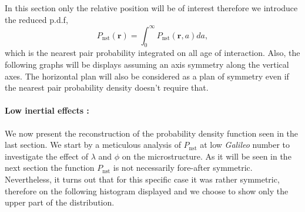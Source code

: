 In this section only the relative position will be of interest therefore we introduce the reduced p.d.f,
\begin{equation*}
    P_\text{nst}(\textbf{r})
    =\int_0^\infty P_\text{nst}(\textbf{r},a) da,
\end{equation*}
which is the nearest pair probability integrated on all age of interaction. 
Also, the following graphs will be displays assuming an axis symmetry along the vertical axes. 
The horizontal plan will also be considered as a plan of symmetry even if the nearest pair probability density doesn't require that. 



\paragraph*{Low inertial effects :}
We now present the reconstruction of the probability density function seen in the last section. 
We start by a meticulous analysis of $P_\text{nst}$ at low \textit{Galileo} number to investigate the effect of $\lambda$ and $\phi$ on the microstructure. 
As it will be seen in the next section the function $P_\text{nst}$ is not necessarily fore-after symmetric. 
Nevertheless, it turns out that for this specific case it was rather symmetric, therefore on the following histogram displayed  \label{fig:Pnst_low_Ga} and \label{fig:Pnst_high_Ga} we choose to show only the upper part of the distribution. 
